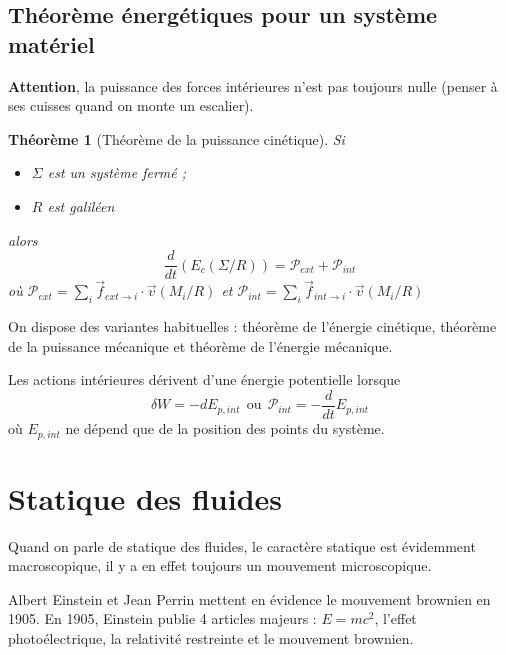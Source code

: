 \documentclass[french]{book}
\theoremstyle{plain}
\newtheorem{thm}{Théorème}
\theoremstyle{definition}
\theoremstyle{remark}
\begin{document}
\subsection{Théorème énergétiques pour un système matériel}
\textbf{Attention}, la puissance des forces intérieures n'est pas toujours nulle (penser à ses cuisses quand on monte un escalier).
\begin{thm}[Théorème de la puissance cinétique]
	Si \begin{itemize}
		\item $\Sigma$ est un système fermé ;
		\item $R$ est galiléen
	\end{itemize} alors $$\frac{d}{dt}\left(E_c(\Sigma/R)\right)=\mathcal{P}_{ext}+\mathcal{P}_{int}$$ où $\mathcal{P}_{ext}=\displaystyle\sum_i \overrightarrow{f}_{ext\to i}\cdot\overrightarrow{v}(M_i/R)$ et $\mathcal{P}_{int}=\displaystyle\sum_i \overrightarrow{f}_{int\to i}\cdot\overrightarrow{v}(M_i/R)$
\end{thm}
On dispose des variantes habituelles : théorème de l'énergie cinétique, théorème de la puissance mécanique et théorème de l'énergie mécanique. \\ \par Les actions intérieures dérivent d'une énergie potentielle lorsque $$\delta W=-dE_{p,int} \ \ \text{ou} \ \ \mathcal{P}_{int}=-\frac{d}{dt}E_{p,int}$$ où $E_{p,int}$ ne dépend que de la position des points du système.
\section{Statique des fluides}
Quand on parle de statique des fluides, le caractère statique est évidemment macroscopique, il y a en effet toujours un mouvement microscopique. \\ \par Albert Einstein et Jean Perrin mettent en évidence le mouvement brownien en 1905. En 1905, Einstein publie 4 articles majeurs : $E=mc^2$, l'effet photoélectrique, la relativité restreinte et le mouvement brownien.
\end{document}
